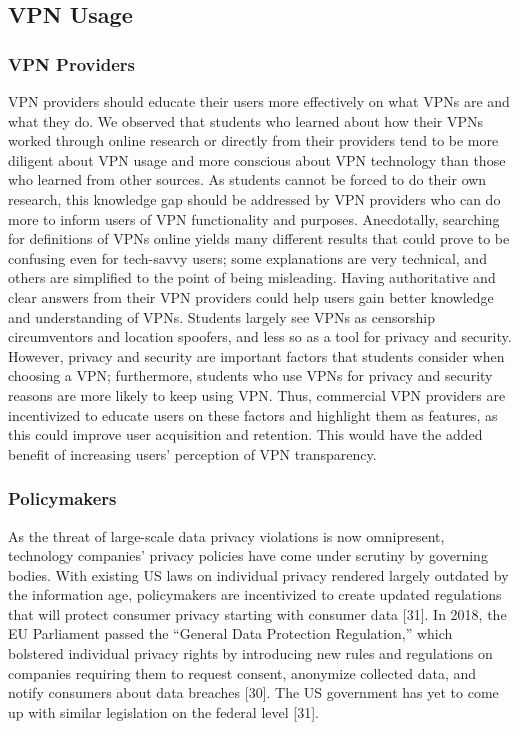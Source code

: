 \subsection{VPN Usage} \subsubsection{VPN Providers}

VPN providers should educate their users more effectively on what VPNs are and
what they do. We observed that students who learned about how their VPNs
worked through online research or directly from their providers tend to be
more diligent about VPN usage and more conscious about VPN technology than
those who learned from other sources. As students cannot be forced to do their
own research, this knowledge gap should be addressed by VPN providers who can
do more to inform users of VPN functionality and purposes. Anecdotally,
searching for definitions of VPNs online yields many different results that
could prove to be confusing even for tech-savvy users; some explanations are
very technical, and others are simplified to the point of being misleading.
Having authoritative and clear answers from their VPN providers could help
users gain better knowledge and understanding of VPNs. Students largely see
VPNs as censorship circumventors and location spoofers, and less so as a tool
for privacy and security. However, privacy and security are important factors
that students consider when choosing a VPN; furthermore, students who use VPNs
for privacy and security reasons are more likely to keep using VPN. Thus,
commercial VPN providers are incentivized to educate users on these factors
and highlight them as features, as this could improve user acquisition and
retention. This would have the added benefit of increasing users’ perception
of VPN transparency.

\subsubsection{Policymakers}

As the threat of large-scale data privacy violations is now omnipresent,
technology companies’ privacy policies have come under scrutiny by governing
bodies. With existing US laws on individual privacy rendered largely outdated
by the information age, policymakers are incentivized to create updated
regulations that will protect consumer privacy starting with consumer data
[31]. In 2018, the EU Parliament passed the “General Data Protection
Regulation,” which bolstered individual privacy rights by introducing new
rules and regulations on companies requiring them to request consent,
anonymize collected data, and notify consumers about data breaches [30]. The
US government has yet to come up with similar legislation on the federal level
[31].

